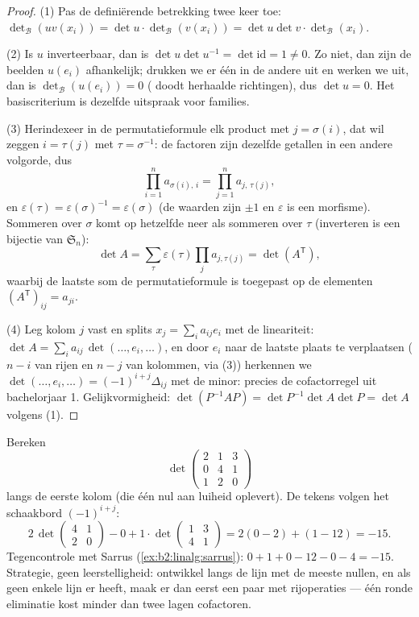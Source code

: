 \begin{proof}
(1) Pas de definiërende betrekking twee keer toe:
$\det_{\mathcal B}(uv(x_i)) = \det u \cdot \det_{\mathcal
B}(v(x_i)) = \det u \det v \cdot \det_{\mathcal B}(x_i)$.

(2) Is $u$ inverteerbaar, dan is $\det u \det u^{-1} = \det
\mathrm{id} = 1 \neq 0$. Zo niet, dan zijn de beelden $u(e_i)$
afhankelijk; drukken we er één in de andere uit en werken we uit,
dan is $\det_{\mathcal B}(u(e_i)) = 0$ ( doodt
herhaalde richtingen), dus $\det u = 0$. Het basiscriterium is
dezelfde uitspraak voor families.

(3) Herindexeer in de permutatieformule elk product met $j =
\sigma(i)$, dat wil zeggen $i = \tau(j)$ met $\tau = \sigma^{-1}$:
de factoren zijn dezelfde getallen in een andere volgorde, dus
\[
\prod_{i=1}^{n} a_{\sigma(i),\,i} = \prod_{j=1}^{n}
a_{j,\,\tau(j)} ,
\]
en $\varepsilon(\tau) = \varepsilon(\sigma)^{-1} =
\varepsilon(\sigma)$ (de waarden zijn $\pm1$ en $\varepsilon$ is
een morfisme). Sommeren over $\sigma$ komt op hetzelfde neer als
sommeren over $\tau$ (inverteren is een bijectie van
$\mathfrak{S}_n$):
\[
\det A = \sum_{\tau}\varepsilon(\tau)\prod_j a_{j,\tau(j)}
= \det(A^{\mathsf T}),
\]
waarbij de laatste som de permutatieformule is toegepast op de
 elementen $(A^{\mathsf T})_{ij} = a_{ji}$.

(4) Leg kolom $j$ vast en splits $x_j = \sum_i a_{ij} e_i$ met de
lineariteit: $\det A = \sum_i a_{ij}\, \det(\dots, e_i, \dots)$,
en door $e_i$ naar de laatste plaats te verplaatsen ($n - i$
 van rijen en $n - j$ van kolommen, via (3))
herkennen we $\det(\dots, e_i, \dots) = (-1)^{i+j}\Delta_{ij}$ met
de minor: precies de cofactorregel uit bachelorjaar 1.
Gelijkvormigheid: $\det(P^{-1}AP) = \det P^{-1}\det A \det P =
\det A$ volgens (1).
\end{proof}

\begin{example}\label{ex:b2:linalg:cofactorwork}
Bereken
\[
\det\begin{pmatrix}
2 & 1 & 3\\
0 & 4 & 1\\
1 & 2 & 0
\end{pmatrix}
\]
langs de eerste kolom (die één nul aan luiheid oplevert). De
tekens volgen het schaakbord $(-1)^{i+j}$:
\[
2\,\det\begin{pmatrix}4 & 1\\ 2 & 0\end{pmatrix}
- 0
+ 1\cdot\det\begin{pmatrix}1 & 3\\ 4 & 1\end{pmatrix}
= 2(0 - 2) + (1 - 12) = -15 .
\]
Tegencontrole met Sarrus (\cref{ex:b2:linalg:sarrus}): $0 + 1 + 0
- 12 - 0 - 4 = -15$. Strategie, geen leerstelligheid: ontwikkel
langs de lijn met de meeste nullen, en als geen enkele lijn er
heeft, maak er dan eerst een paar met rijoperaties --- één ronde
eliminatie kost minder dan twee lagen cofactoren.
\end{example}


